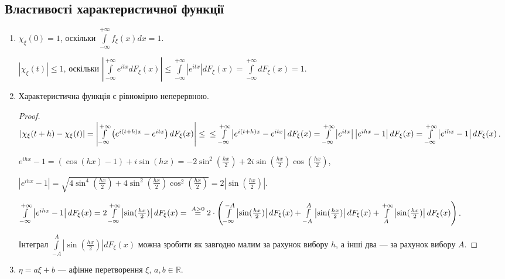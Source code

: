 \subsection{Властивості характеристичної функції}
\begin{enumerate}
    \item $\chi_\xi(0) = 1$, оскільки $\int\limits_{-\infty}^{+\infty} f_\xi(x)dx = 1$.
    
    $\left|\chi_\xi(t)\right| \leq 1$, оскільки $\left|\int\limits_{-\infty}^{+\infty} e^{itx} dF_\xi(x)\right| \leq \int\limits_{-\infty}^{+\infty} \left|e^{itx}\right| dF_\xi(x) = \int\limits_{-\infty}^{+\infty} dF_\xi(x) = 1$.
    \item Характеристична функція є рівномірно неперервною.
    \begin{proof}
        $\left| \chi_\xi(t+h) - \chi_\xi(t) \right| = 
        \left| \int\limits_{-\infty}^{+\infty} \left( e^{i(t+h)x} - e^{itx}\right) dF_\xi(x) \right| \leq \\
        \leq \int\limits_{-\infty}^{+\infty} \left|e^{i(t+h)x} - e^{itx}\right| dF_\xi(x) = 
        \int\limits_{-\infty}^{+\infty} \left|e^{itx}\right|\left| e^{ihx} - 1\right| dF_\xi(x) = 
        \int\limits_{-\infty}^{+\infty} \left|e^{ihx} - 1\right| dF_\xi(x)$.

        $e^{ihx} - 1 = (\cos(hx) - 1) + i\sin(hx) = -2\sin^2(\frac{hx}{2}) + 2i\sin(\frac{hx}{2})\cos(\frac{hx}{2})$, 
        
        $\left| e^{ihx} - 1\right| = 
        \sqrt{4\sin^4(\frac{hx}{2}) + 4\sin^2(\frac{hx}{2})\cos^2(\frac{hx}{2})} = 2\left| \sin(\frac{hx}{2})\right|$.

        $\int\limits_{-\infty}^{+\infty} \left|e^{ihx} - 1\right| dF_\xi(x) = 2 \int\limits_{-\infty}^{+\infty} \left| \sin(\frac{hx}{2})\right| dF_\xi(x) =
        \\\overset{A>0}{=} 2\cdot \left( \int\limits_{-\infty}^{-A}\left| \sin(\frac{hx}{2})\right| dF_\xi(x) + 
        \int\limits_{-A}^{A}\left| \sin(\frac{hx}{2})\right| dF_\xi(x) + 
        \int\limits_{A}^{+\infty}\left| \sin(\frac{hx}{2})\right| dF_\xi(x)\right)
        $.

        Інтеграл $\int\limits_{-A}^{A}\left| \sin(\frac{hx}{2})\right| dF_\xi(x)$
        можна зробити як завгодно малим за рахунок вибору $h$,
        а інші два --- за рахунок вибору $A$.
    \end{proof}
    \item $\eta = a\xi + b$ --- афінне перетворення $\xi$, $a, b \in \mathbb{R}$.


\end{enumerate}
